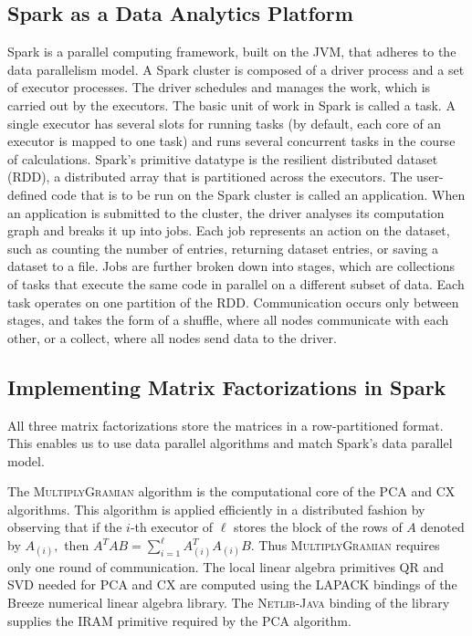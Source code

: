 
\subsection{Spark as a Data Analytics Platform} 

Spark is a parallel computing framework, built on the JVM, that adheres to the data parallelism model. A Spark cluster is composed of a driver process and a set of executor processes. The driver schedules and manages the work, which is carried out by the executors. The basic unit of work in Spark is called a task. A single executor has several slots for running tasks (by default, each core of an executor is mapped to one task) and runs several concurrent tasks in the course of calculations. Spark's primitive datatype is the resilient distributed dataset (RDD), a distributed array that is partitioned across the executors. The user-defined code that is to be run on the Spark cluster is called an application. When an application is submitted to the cluster, the driver analyses its computation graph and breaks it up into jobs.  Each job represents an action on the dataset, such as counting the number of entries, returning dataset entries, or saving a dataset to a file. Jobs are further broken down into stages, which are collections of tasks that execute the same code in parallel on a different subset of data. Each task operates on one partition of the RDD. Communication occurs only between stages, and takes the form of a shuffle, where all nodes communicate with each other, or a collect, where all nodes send data to the driver.

\subsection{Implementing Matrix Factorizations in Spark}

All three matrix factorizations store the matrices in a row-partitioned format. This enables us to use data parallel algorithms and match Spark's data parallel model.

The \textsc{MultiplyGramian} algorithm is the computational core of the PCA and CX algorithms.
This algorithm is applied efficiently in a distributed fashion by observing that if the $i$-th executor of $\ell$ stores the block of the rows of $A$ denoted by $A_{(i)},$ then $A^TA B = \sum_{i=1}^\ell A_{(i)}^T A_{(i)} B.$ Thus \textsc{MultiplyGramian} requires only one round of communication.  The local linear algebra primitives \textsc{QR} and \textsc{SVD} needed for PCA and CX are computed using the \textsc{LAPACK} bindings of the Breeze numerical linear algebra library.  The \textsc{Netlib-Java} binding of the  library supplies the \textsc{IRAM} primitive required by the PCA algorithm. 

